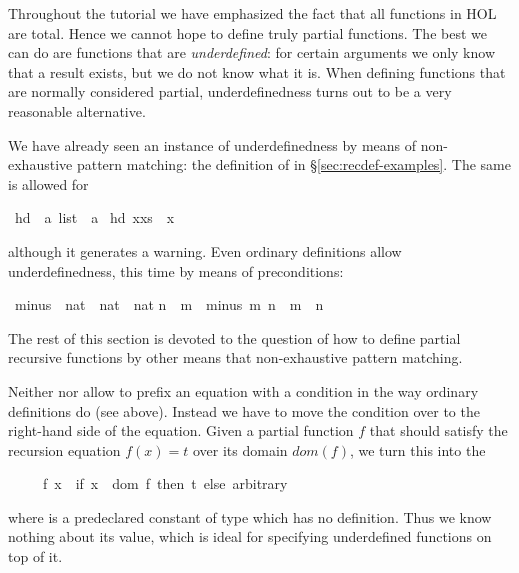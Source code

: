 %
\begin{isabellebody}%
\def\isabellecontext{Partial}%
%
\begin{isamarkuptext}%
\noindent
Throughout the tutorial we have emphasized the fact that all functions
in HOL are total. Hence we cannot hope to define truly partial
functions. The best we can do are functions that are
\emph{underdefined}:
for certain arguments we only know that a result
exists, but we do not know what it is. When defining functions that are
normally considered partial, underdefinedness turns out to be a very
reasonable alternative.

We have already seen an instance of underdefinedness by means of
non-exhaustive pattern matching: the definition of  in
\S\ref{sec:recdef-examples}. The same is allowed for %
\end{isamarkuptext}%
\ hd\ {\isacharcolon}{\isacharcolon}\ {\isachardoublequote}{\isacharprime}a\ list\ {\isasymRightarrow}\ {\isacharprime}a{\isachardoublequote}\isanewline
{}\ {\isachardoublequote}hd\ {\isacharparenleft}x{\isacharhash}xs{\isacharparenright}\ {\isacharequal}\ x{\isachardoublequote}%
\begin{isamarkuptext}%
\noindent
although it generates a warning.
Even ordinary definitions allow underdefinedness, this time by means of
preconditions:%
\end{isamarkuptext}%
\ minus\ {\isacharcolon}{\isacharcolon}\ {\isachardoublequote}nat\ {\isasymRightarrow}\ nat\ {\isasymRightarrow}\ nat{\isachardoublequote}\isanewline
{\isachardoublequote}n\ {\isasymle}\ m\ {\isasymLongrightarrow}\ minus\ m\ n\ {\isasymequiv}\ m\ {\isacharminus}\ n{\isachardoublequote}%
\begin{isamarkuptext}%
The rest of this section is devoted to the question of how to define
partial recursive functions by other means that non-exhaustive pattern
matching.%
\end{isamarkuptext}%
%
%
\begin{isamarkuptext}%
Neither  nor  allow to
prefix an equation with a condition in the way ordinary definitions do
(see  above). Instead we have to move the condition over
to the right-hand side of the equation. Given a partial function $f$
that should satisfy the recursion equation $f(x) = t$ over its domain
$dom(f)$, we turn this into the 
\begin{isabelle}%
\ \ \ \ \ f\ x\ {\isacharequal}\ {\isacharparenleft}if\ x\ {\isasymin}\ dom\ f\ then\ t\ else\ arbitrary{\isacharparenright}%
\end{isabelle}
where  is a predeclared constant of type 
which has no definition. Thus we know nothing about its value,
which is ideal for specifying underdefined functions on top of it.


\end{isamarkuptext}
\end{isabellebody}
